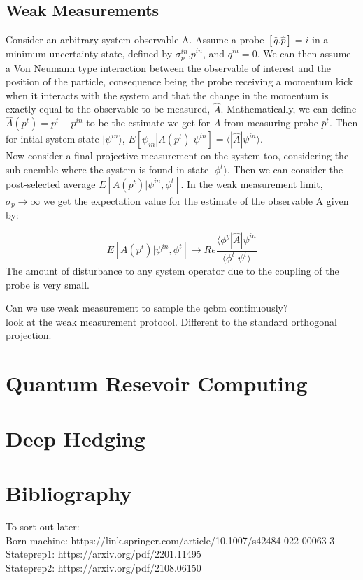 \documentclass{article}
\begin{document}
\subsection{Weak Measurements}

Consider an arbitrary system observable A. Assume a probe $[\hat{q}.\hat{p}] = i$
in a minimum uncertainty state, defined by $\sigma^{in}_p$,$\bar{p}^{in}$, and 
$\bar{q}^{in}=0$. We can then assume a Von Neumann type interaction between the 
observable of interest and the position of the particle, consequence being the 
probe receiving a momentum kick when it interacts with the system and that the 
change in the momentum is exactly equal to the observable to be measured, $\hat{A}$. 
Mathematically, we can define $\hat{A}(p^t) = p^t-p^{in}$ to be the estimate we 
get for $A$ from measuring probe $\bar{p}^t$. Then for intial system state $|\psi^{in}\rangle$, 
$E[\psi_{in}|A(p^t)|\psi^{in}]=\langle|\hat{A}|\psi^{in}\rangle$.\\
Now consider a final projective measurement on the system too, considering the 
sub-enemble where the system is found in state $|\phi^t\rangle$. Then we can consider 
the post-selected average $E[A(p^t)|\psi^{in},\phi^{t}]$.
In the weak measurement limit, $\sigma_p\rightarrow\infty$ we get the expectation value for the estimate 
of the observable A given by: 

$$E[A(p^t)|\psi^{in},\phi^t]\rightarrow Re\frac{\langle\phi^y|\hat{A}|\psi^{in}}{\langle\phi^t|\psi^t\rangle}$$
The amount of disturbance to any system operator due to the coupling of the probe is very small. 


Can we use weak measurement to sample the qcbm continuously?\\
look at the weak measurement protocol.
Different to the standard orthogonal projection. 



\section{Quantum Resevoir Computing}


\clearpage
\section{Deep Hedging}


\clearpage 
\section{Bibliography}
To sort out later:\\
Born machine: https://link.springer.com/article/10.1007/s42484-022-00063-3
\\
Stateprep1: https://arxiv.org/pdf/2201.11495
\\
Stateprep2: https://arxiv.org/pdf/2108.06150
\end{document}
